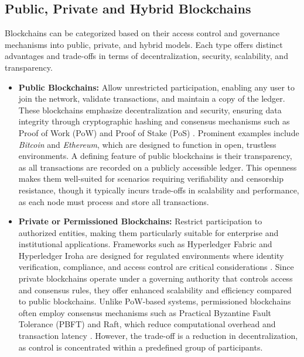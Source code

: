\documentclass[final]{rc-book-2.14}
\begin{document}
\subsection{Public, Private and Hybrid Blockchains}

Blockchains can be categorized based on their access control and governance mechanisms into public, private, and hybrid models. Each type offers distinct advantages and trade-offs in terms of decentralization, security, scalability, and transparency.

\begin{itemize}

    \item \textbf{Public Blockchains:} Allow unrestricted participation, enabling any user to join the network, validate transactions, and maintain a copy of the ledger. These blockchains emphasize decentralization and security, ensuring data integrity through cryptographic hashing and consensus mechanisms such as Proof of Work (PoW) and Proof of Stake (PoS) \cite{nakamoto2008bitcoin}. Prominent examples include \textit{Bitcoin} and \textit{Ethereum}, which are designed to function in open, trustless environments. A defining feature of public blockchains is their transparency, as all transactions are recorded on a publicly accessible ledger. This openness makes them well-suited for scenarios requiring verifiability and censorship resistance, though it typically incurs trade-offs in scalability and performance, as each node must process and store all transactions.
    
    \item \textbf{Private or Permissioned Blockchains:} Restrict participation to authorized entities, making them particularly suitable for enterprise and institutional applications. Frameworks such as Hyperledger Fabric and Hyperledger Iroha are designed for regulated environments where identity verification, compliance, and access control are critical considerations \cite{cachin2016architecture}. Since private blockchains operate under a governing authority that controls access and consensus rules, they offer enhanced scalability and efficiency compared to public blockchains. Unlike PoW-based systems, permissioned blockchains often employ consensus mechanisms such as Practical Byzantine Fault Tolerance (PBFT) and Raft, which reduce computational overhead and transaction latency \cite{vukolic2017}. However, the trade-off is a reduction in decentralization, as control is concentrated within a predefined group of participants.
    

\end{itemize}
\end{document}
